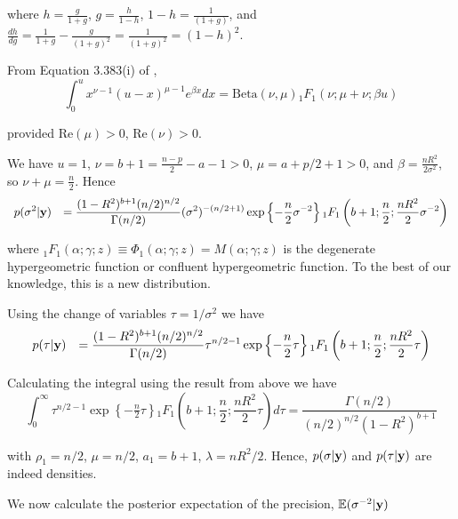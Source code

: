 \documentclass{amsart}[12pt]
\newcommand{\mgc}[1]{{\color{blue}#1}}
\begin{document}

\noindent where
$h = \frac{g}{1+g}$,
$g = \frac{h}{1-h}$,
$1 - h = \frac{1}{(1 + g)}$,
and
$\frac{dh}{dg} = \frac{1}{1+g} - \frac{g}{(1 +g)^2} = \frac{1}{(1+g)^2} = (1 - h)^2$.

\noindent From Equation 3.383(i) of \cite{Gradshteyn1988},
$$
\int_{0}^u x^{\nu - 1} (u - x)^{\mu - 1}  e^{\beta x} dx = \mbox{Beta}(\nu,\mu) {}_1 F_1(\nu;\mu+\nu;\beta u)
$$

\noindent provided $\mbox{Re}(\mu)>0$, $\mbox{Re}(\nu)>0$.

\noindent We have
$u = 1$, $\nu = b + 1 = \frac{n-p}{2} - a - 1 >0$, $\mu = a + p/2 + 1 >0$, and 
$\beta = \frac{nR^2}{2\sigma^2}$, so $\nu + \mu = \frac{n}{2}$. Hence
$$
\begin{array}{rl}
	\displaystyle p(\sigma^2|{\bf y}) 
	  & \displaystyle = \frac{(1 -  R^2)^{b+1} ( n/2)^{n/2}}{\Gamma(n/2)} 
	(\sigma^2)^{-(n/2 + 1)}\exp\left\{ -  \frac{n}{2} \sigma^{-2} \right\}  {}_1 F_1\left(
	b + 1; \frac{n}{2}; \frac{nR^2}{2} \sigma^{-2} \right)
\end{array}
$$

\noindent where ${}_1 F_1(\alpha;\gamma;z) \equiv \Phi_1(\alpha;\gamma;z) = M(\alpha;\gamma;z)$ 
is the
degenerate hypergeometric function or
confluent hypergeometric function. To the best of our knowledge, this is a new distribution.

\noindent Using the change of variables $\tau= 1/\sigma^2$ we have
$$
\begin{array}{rl}
	\displaystyle p(\tau|{\bf y}) 
	  & \displaystyle = \frac{(1 -  R^2)^{b+1} ( n/2)^{n/2}}{\Gamma(n/2)} 
	\tau^{n/2 - 1}\exp\left\{ -  \frac{n}{2} \tau \right\} {}_1 F_1\left(
	b + 1; \frac{n}{2}; \frac{nR^2}{2} \tau \right)
\end{array}
$$

\noindent Calculating the integral using the result from \cite{Gradshteyn1988} above we have
$$
\int_0^\infty \tau^{n/2 - 1}\exp\left\{ -  \tfrac{n}{2} \tau \right\}{}_1 F_1\left(
b + 1; \frac{n}{2}; \frac{nR^2}{2} \tau \right) d \tau = 
\frac{\Gamma(n/2)}{(n/2)^{n/2}\left( 1 - R^2\right)^{b+1}}
$$

\noindent with $\rho_1 = n/2$, $\mu = n/2$, $a_1 = b+1$, $\lambda = nR^2/2$. Hence, $p(\sigma|{\bf y})$ and $p(\tau|{\bf y})$ are indeed densities.


We now calculate the posterior expectation of the precision, ${\mathbb E}(\sigma^{-2}|{\bf y})$
\end{document}
